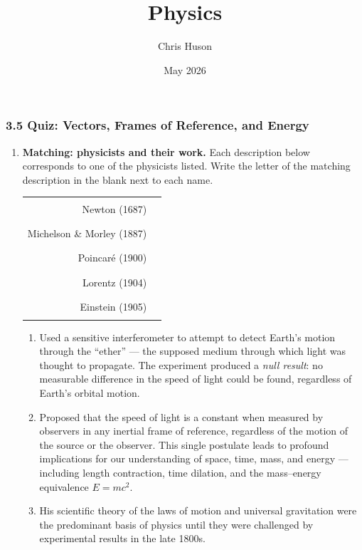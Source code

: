 \documentclass[12pt, twoside]{article}
\title{Physics}
\author{Chris Huson}
\date{May 2026}
\begin{document}
\subsubsection*{3.5 Quiz: Vectors, Frames of Reference, and Energy}

\begin{enumerate}

\item \textbf{Matching: physicists and their work.} Each description below corresponds to one of the physicists listed. Write the letter of the matching description in the blank next to each name.

\vspace{0.3cm}

\begin{tabular}{rl}
Newton (1687) & \rule{2cm}{0.4pt} \\[0.5cm]
Michelson \& Morley (1887) & \rule{2cm}{0.4pt} \\[0.5cm]
Poincaré (1900) & \rule{2cm}{0.4pt} \\[0.5cm]
Lorentz (1904) & \rule{2cm}{0.4pt} \\[0.5cm]
Einstein (1905) & \rule{2cm}{0.4pt} \\
\end{tabular}

\vspace{0.6cm}

\begin{enumerate}[label=(\alph*), itemsep=0.4cm]
\item Used a sensitive interferometer to attempt to detect Earth's motion through the ``ether'' --- the supposed medium through which light was thought to propagate. The experiment produced a \emph{null result}: no measurable difference in the speed of light could be found, regardless of Earth's orbital motion.

\item Proposed that the speed of light is a constant when measured by observers in any inertial frame of reference, regardless of the motion of the source or the observer. This single postulate leads to profound implications for our understanding of space, time, mass, and energy --- including length contraction, time dilation, and the mass--energy equivalence $E = mc^{2}$.

\item His scientific theory of the laws of motion and universal gravitation were the predominant basis of physics until they were challenged by experimental results in the late 1800s.


\end{enumerate}
\end{enumerate}
\end{document}
